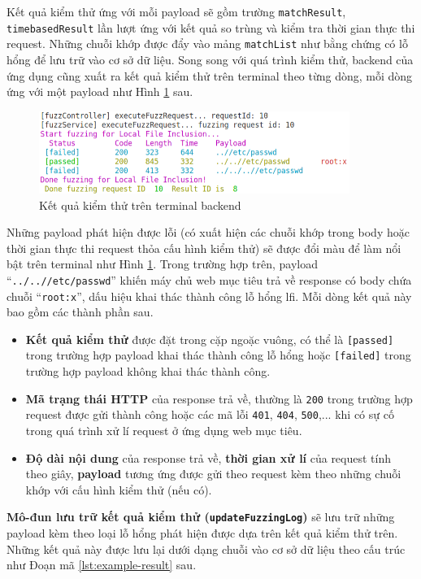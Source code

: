 Kết quả kiểm thử ứng với mỗi payload sẽ gồm trường \texttt{matchResult}, \texttt{timebasedResult} lần lượt ứng với kết quả so trùng và kiểm tra thời gian thực thi request. Những chuỗi khớp được đẩy vào mảng \texttt{matchList} như bằng chứng có lỗ hổng để lưu trữ vào cơ sở dữ liệu. Song song với quá trình kiểm thử, backend của ứng dụng cũng xuất ra kết quả kiểm thử trên terminal theo từng dòng, mỗi dòng ứng với một payload như Hình \ref{fig:terminal-result} sau.
\begin{figure}[H]
  \centering
    \includegraphics[width=0.9\textwidth,keepaspectratio=true]{images/terminal-result.png}
  \caption{Kết quả kiểm thử trên terminal backend}
  \label{fig:terminal-result}
\end{figure}
Những payload phát hiện được lỗi (có xuất hiện các chuỗi khớp trong body hoặc thời gian thực thi request thỏa cấu hình kiểm thử) sẽ được đổi màu để làm nổi bật trên terminal như Hình \ref{fig:terminal-result}. Trong trường hợp trên, payload ``\texttt{../..//etc/passwd}'' khiến máy chủ web mục tiêu trả về response có body chứa chuỗi ``\texttt{root:x}'', dấu hiệu khai thác thành công lỗ hổng \acrshort{lfi}. Mỗi dòng kết quả này bao gồm các thành phần sau.
\begin{itemize}
  \item \textbf{Kết quả kiểm thử} được đặt trong cặp ngoặc vuông, có thể là \texttt{[passed]} trong trường hợp payload khai thác thành công lỗ hổng hoặc \texttt{[failed]} trong trường hợp payload không khai thác thành công.
  \item \textbf{Mã trạng thái HTTP} của response trả về, thường là \texttt{200} trong trường hợp request được gửi thành công hoặc các mã lỗi \texttt{401}, \texttt{404}, \texttt{500},... khi có sự cố trong quá trình xử lí request ở ứng dụng web mục tiêu.
  \item \textbf{Độ dài nội dung} của response trả về, \textbf{thời gian xử lí} của request tính theo giây, \textbf{payload} tương ứng được gửi theo request kèm theo những chuỗi khớp với cấu hình kiểm thử (nếu có).
\end{itemize}
\textbf{Mô-đun lưu trữ kết quả kiểm thử (\texttt{updateFuzzingLog})} sẽ lưu trữ những payload kèm theo loại lỗ hổng phát hiện được dựa trên kết quả kiểm thử trên. Những kết quả này được lưu lại dưới dạng chuỗi vào cơ sở dữ liệu theo cấu trúc như Đoạn mã \ref{lst:example-result} sau.
